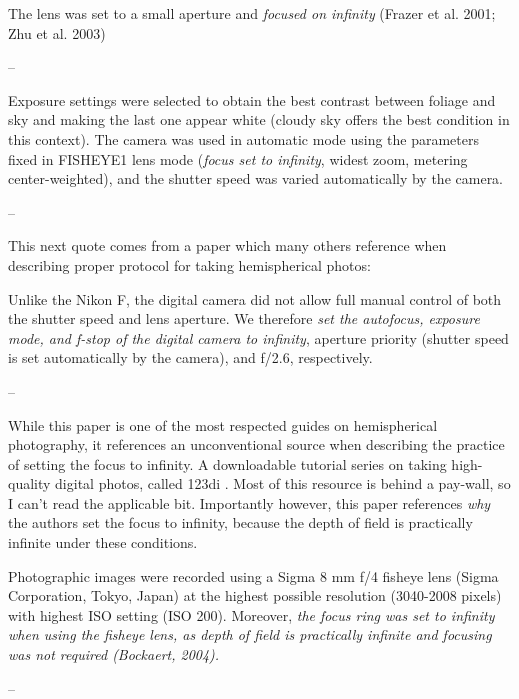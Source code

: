 \documentclass[11pt,a4paper]{article}
\begin{document}
\begin{minipage}{\linewidth}
\begin{framed}
The lens was set to a small aperture and \textit{focused on infinity} (Frazer et al. 2001; Zhu et al. 2003)

-- \citealt{Hu2009}
\end{framed}
\end{minipage}

\begin{minipage}{\linewidth}
\begin{framed}
Exposure settings were selected to obtain the best contrast between foliage and sky and making the last one appear white (cloudy sky offers the best condition in this context). The camera was used in automatic mode using the parameters fixed in FISHEYE1 lens mode (\textit{focus set to infinity}, widest zoom, metering center-weighted), and the shutter speed was varied automatically by the camera.

-- \citealt{Paletto2009}
\end{framed}
\end{minipage}

This next quote comes from a paper which many others reference when describing proper protocol for taking hemispherical photos: 

\begin{minipage}{\linewidth}
\begin{framed}
Unlike the Nikon F, the digital camera did not allow full manual control of both the shutter speed and lens aperture. We therefore \textit{set the autofocus, exposure mode, and f-stop of the digital camera to infinity}, aperture priority (shutter speed is set automatically by the camera), and f/2.6, respectively. 

-- \citealt{Frazer2001}
\end{framed}
\end{minipage}

While this paper is one of the most respected guides on hemispherical photography, it references an unconventional source when describing the practice of setting the focus to infinity. A downloadable tutorial series on taking high-quality digital photos, called 123di \citep{123di}. Most of this resource is behind a pay-wall, so I can't read the applicable bit. Importantly however, this paper references \textit{why} the authors set the focus to infinity, because the depth of field is practically infinite under these conditions.

\begin{minipage}{\linewidth}
\begin{framed}
Photographic images were recorded using a Sigma 8 mm f/4 fisheye lens (Sigma Corporation, Tokyo, Japan) at the highest possible resolution (3040-2008 pixels) with highest ISO setting (ISO 200). Moreover, \textit{the focus ring was set to infinity when using the fisheye lens, as depth of field is practically infinite and focusing was not required (Bockaert, 2004).}

-- \citealt{Jonckheere2005}
\end{framed}
\end{minipage}
\end{document}
